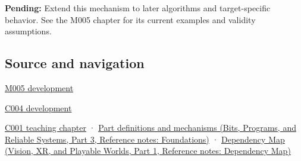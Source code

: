 \textbf{Pending:} Extend this mechanism to later algorithms and target-specific behavior. See the M005 chapter for its current examples and validity assumptions.

\subsection{Source and navigation}\label{appendix-343615f49ddf-source-and-navigation}

\hypertarget{appendix-343615f49ddf-source-and-navigation}{}

\hyperref[01-foundations-i-ch001-when-arithmetic-meets-uncertainty]{M005 development}

\hyperref[01-foundations-i-ch001-a-stretching-ruler-for-real-valued-quantities]{C004 development}

\hyperref[01-foundations-i-ch001-from-a-signal-to-an-interpretation]{C001 teaching chapter} · \href{../01-Bits-Programs-and-Reliable-Systems-P03/main.pdf\#nameddest=appendix-fd090d982a15}{Part definitions and mechanisms (Bits, Programs, and Reliable Systems, Part 3, Reference notes: Foundations)} · \href{../07-Vision-XR-and-Playable-Worlds-P01/main.pdf\#nameddest=appendix-4ad47bdd269a}{Dependency Map (Vision, XR, and Playable Worlds, Part 1, Reference notes: Dependency Map)}
